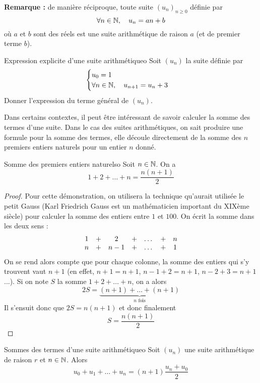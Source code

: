 \textbf{Remarque :} de manière réciproque, toute suite $(u_n)_{n\geq 0}$ définie par \[\forall n\in\mathbb{N},\quad u_n=an+b\] où $a$ et $b$ sont des réels est une suite arithmétique de raison $a$ (et de premier terme $b$).

\begin{exemple}{Expression explicite d'une suite arithmétique}{o}
	Soit $(u_n)$ la suite définie par \[\begin{cases}u_0=1\\\forall n\in\mathbb{N},\quad u_{n+1}=u_n+3\end{cases}\]
	Donner l'expression du terme général de $(u_n)$.
\end{exemple}
Dans certains contextes, il peut être intéressant de savoir calculer la somme des termes d'une suite. Dans le cas des suites arithmétiques, on sait produire une formule pour la somme des termes, elle découle directement de la somme des $n$ premiers entiers naturels pour un entier $n$ donné.

\begin{lemme}{Somme des premiers entiers naturels}{o}
Soit $n\in\mathbb{N}$. On a \[1+2+\dots+n=\frac{n(n+1)}2\]
\end{lemme}

\begin{proof}
Pour cette démonstration, on utilisera la technique qu'aurait utilisée le petit Gauss (Karl Friedrich Gauss est un mathématicien important du XIXème siècle) pour calculer la somme des entiers entre $1$ et $100$. On écrit la somme dans les deux sens : 
\[
\begin{array}{c c c c c c c}
	1 & + & 2 & + & \dots & + & n\\
	n & + & n-1 & + & \dots & + & 1
\end{array}
\]
On se rend alors compte que pour chaque colonne, la somme des entiers qui s'y trouvent vaut $n+1$ (en effet, $n + 1 = n+1$, $n-1+2=n+1$, $n-2+3=n+1$...). Si on note $S$ la somme $1+2+\dots+n$, on a alors \[2S=\underbrace{(n+1)+\dots+(n+1)}_{n\text{ fois}}\]
Il s'ensuit donc que $2S=n(n+1)$ et donc finalement \[S=\frac{n(n+1)}2\]
\end{proof}

\begin{proposition}{Sommes des termes d'une suite arithmétique}{o}
Soit $(u_n)$ une suite arithmétique de raison $r$ et $n\in\mathbb{N}$. Alors 
\[u_0+u_1+\dots+u_n=(n+1)\frac{u_n+u_0}2\]
\end{proposition}

